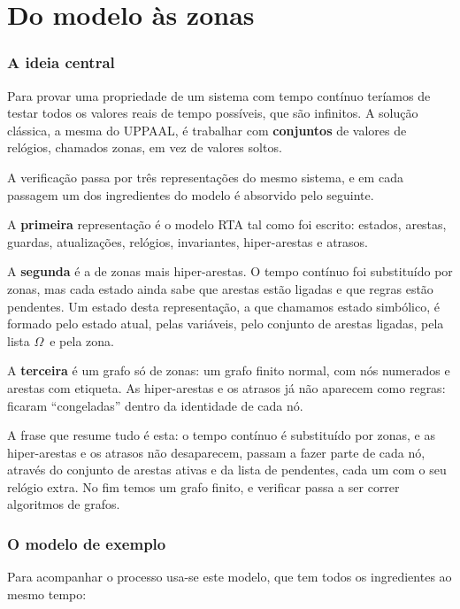 \documentclass[11pt,a4paper]{article}
\newcommand{\Om}{$\Omega$}
\begin{document}
\part{Do modelo às zonas}

\section{A ideia central}

Para provar uma propriedade de um sistema com tempo contínuo teríamos de testar todos os valores reais de tempo possíveis, que são infinitos. A solução clássica, a mesma do UPPAAL, é trabalhar com \textbf{conjuntos} de valores de relógios, chamados zonas, em vez de valores soltos.

A verificação passa por três representações do mesmo sistema, e em cada passagem um dos ingredientes do modelo é absorvido pelo seguinte.

A \textbf{primeira} representação é o modelo RTA tal como foi escrito: estados, arestas, guardas, atualizações, relógios, invariantes, hiper-arestas e atrasos.

A \textbf{segunda} é a de zonas mais hiper-arestas. O tempo contínuo foi substituído por zonas, mas cada estado ainda sabe que arestas estão ligadas e que regras estão pendentes. Um estado desta representação, a que chamamos estado simbólico, é formado pelo estado atual, pelas variáveis, pelo conjunto de arestas ligadas, pela lista \Om\ e pela zona.

A \textbf{terceira} é um grafo só de zonas: um grafo finito normal, com nós numerados e arestas com etiqueta. As hiper-arestas e os atrasos já não aparecem como regras: ficaram ``congeladas'' dentro da identidade de cada nó.

A frase que resume tudo é esta: o tempo contínuo é substituído por zonas, e as hiper-arestas e os atrasos não desaparecem, passam a fazer parte de cada nó, através do conjunto de arestas ativas e da lista de pendentes, cada um com o seu relógio extra. No fim temos um grafo finito, e verificar passa a ser correr algoritmos de grafos.

\section{O modelo de exemplo}

Para acompanhar o processo usa-se este modelo, que tem todos os ingredientes ao mesmo tempo:
\end{document}
